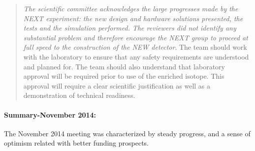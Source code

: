 \begin{quotation}
{\em The scientific committee acknowledges the large progresses made by the NEXT experiment: the new design and hardware solutions presented, the tests and the simulation performed.  The reviewers did not identify any substantial problem and therefore encourage the NEXT group to proceed at full speed to the construction of the NEW detector}.  The team should work with the laboratory to ensure that any safety requirements are understood and planned for. The team should also understand that laboratory approval will be required prior to use of the enriched isotope. This approval will require a clear scientific justification as well as a demonstration of technical readiness.

\end{quotation}

\paragraph{Summary-November 2014:} The November 2014 meeting was characterized by steady progress, and a sense of optimism related with better funding prospects. 